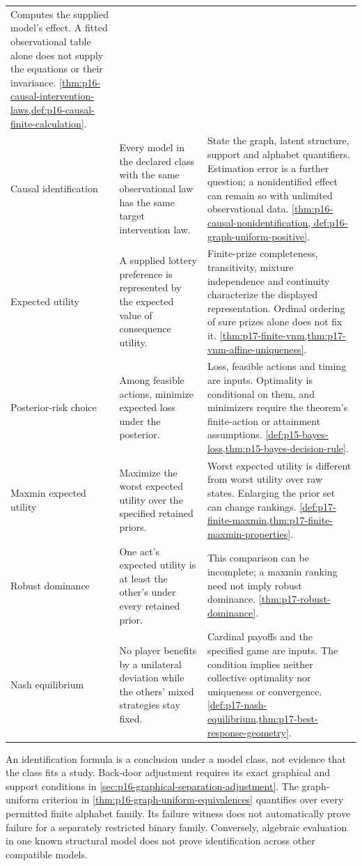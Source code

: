 \begin{longtable}{@{}p{}p{}p{}@{}}
Computes the supplied model's effect. A fitted observational table alone
does not supply the equations or their invariance.
\cref{thm:p16-causal-intervention-laws,def:p16-causal-finite-calculation}. \\
Causal identification & Every model in the declared class with the same
observational law has the same target intervention law. & State the graph,
latent structure, support and alphabet quantifiers. Estimation error is a
further question; a nonidentified effect can remain so with unlimited
observational data. \cref{thm:p16-causal-nonidentification,
def:p16-graph-uniform-positive}. \\
Expected utility & A supplied lottery preference is represented by the
expected value of consequence utility. & Finite-prize completeness,
transitivity, mixture independence and continuity characterize the displayed
representation. Ordinal ordering of sure prizes alone does not fix it.
\cref{thm:p17-finite-vnm,thm:p17-vnm-affine-uniqueness}. \\
Posterior-risk choice & Among feasible actions, minimize expected loss
under the posterior. & Loss, feasible actions and timing are inputs.
Optimality is conditional on them, and minimizers require the theorem's
finite-action or attainment assumptions.
\cref{def:p15-bayes-loss,thm:p15-bayes-decision-rule}. \\
Maxmin expected utility & Maximize the worst expected utility over the
specified retained priors. & Worst expected utility is different from
worst utility over raw states. Enlarging the prior set can change rankings.
\cref{def:p17-finite-maxmin,thm:p17-finite-maxmin-properties}. \\
Robust dominance & One act's expected utility is at least the other's
under every retained prior. & This comparison can be incomplete; a maxmin
ranking need not imply robust dominance.
\cref{thm:p17-robust-dominance}. \\
Nash equilibrium & No player benefits by a unilateral deviation while the
others' mixed strategies stay fixed. & Cardinal payoffs and the specified
game are inputs. The condition implies neither collective optimality nor
uniqueness or convergence.
\cref{def:p17-nash-equilibrium,thm:p17-best-response-geometry}. \\
\bottomrule
\end{longtable}

An identification formula is a conclusion under a model class, not evidence
that the class fits a study. Back-door adjustment requires its exact graphical
and support conditions in \cref{sec:p16-graphical-separation-adjustment}.
The graph-uniform criterion in \cref{thm:p16-graph-uniform-equivalences}
quantifies over every permitted finite alphabet family. Its failure witness
does not automatically prove failure for a separately restricted binary
family. Conversely, algebraic evaluation in one known structural model
does not prove identification across other compatible models.

